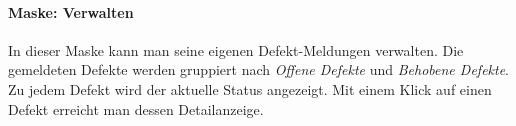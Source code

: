 \begin{figure}[H]
\hfill
{}
\end{figure}

\paragraph{Maske: Verwalten}
In dieser Maske kann man seine eigenen Defekt-Meldungen verwalten. Die gemeldeten Defekte werden gruppiert nach \emph{Offene Defekte} und \emph{Behobene Defekte}. Zu jedem Defekt wird der aktuelle Status angezeigt. Mit einem Klick auf einen Defekt erreicht man dessen Detailanzeige.

